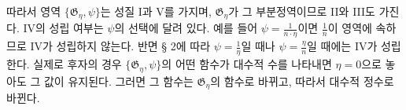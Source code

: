 
따라서 영역 $\{\mathfrak G_\eta,\psi\}$는 성질 I과 V를 가지며, $\mathfrak G_\eta$가 그 부분정역이므로 II와 III도 가진다. IV의 성립 여부는 $\psi$의 선택에 달려 있다. 예를 들어 $\psi=\frac{1}{n\cdot\eta}$이면 $\frac1n$이 영역에 속하므로 IV가 성립하지 않는다. 반면 § 2에 따라 $\psi=\frac1\eta$일 때나 $\psi=\frac{\eta}{n}$일 때에는 IV가 성립한다. 실제로 후자의 경우 $\{\mathfrak G_\eta,\psi\}$의 어떤 함수가 대수적 수를 나타내면 $\eta=0$으로 놓아도 그 값이 유지된다. 그러면 그 함수는 $\mathfrak G_\eta$의 함수로 바뀌고, 따라서 대수적 정수로 바뀐다.
